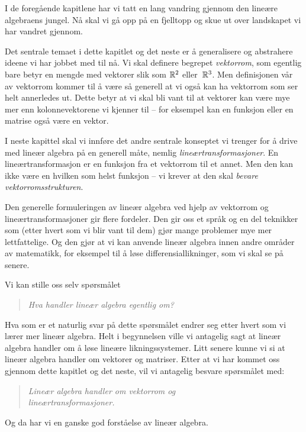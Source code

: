 

\label{ch:vektorrom}

I de foregående kapitlene har vi tatt en lang vandring gjennom den
lineære algebraens jungel.  Nå skal vi gå opp på en fjelltopp og skue
ut over landskapet vi har vandret gjennom.

Det sentrale temaet i dette kapitlet og det neste er å generalisere og
abstrahere ideene vi har jobbet med til nå.  Vi skal definere begrepet
\emph{vektorrom}, som egentlig bare betyr en mengde med vektorer slik
som $\mathbb{R}^2$ eller~$\mathbb{R}^3$.  Men definisjonen vår av vektorrom kommer til
å være så generell at vi også kan ha vektorrom som ser helt annerledes
ut.  Dette betyr at vi skal bli vant til at vektorer kan være mye mer
enn kolonnevektorene vi kjenner til -- for eksempel kan en funksjon
eller en matrise også være en vektor.

I neste kapittel skal vi innføre det andre sentrale konseptet vi
trenger for å drive med lineær algebra på en generell måte, nemlig
\emph{lineærtransformasjoner}.  En lineærtransformasjon er en funksjon
fra et vektorrom til et annet.  Men den kan ikke være en hvilken som
helst funksjon -- vi krever at den skal \emph{bevare
  vektorromsstrukturen}.

Den generelle formuleringen av lineær algebra ved hjelp av vektorrom
og lineærtransformasjoner gir flere fordeler.  Den gir oss et språk og
en del teknikker som (etter hvert som vi blir vant til dem) gjør mange
problemer mye mer lettfattelige.  Og den gjør at vi kan anvende lineær
algebra innen andre områder av matematikk, for eksempel til å løse
differensiallikninger, som vi skal se på senere.



\medskip
Vi kan stille oss selv spørsmålet
\begin{quote}
\emph{Hva handler lineær algebra egentlig om?}
\end{quote}
Hva som er et naturlig svar på dette spørsmålet endrer seg etter
hvert som vi lærer mer lineær algebra.  Helt i begynnelsen ville vi
antagelig sagt at lineær algebra handler om å løse lineære
likningssystemer.  Litt senere kunne vi si at lineær algebra handler
om vektorer og matriser.  Etter at vi har kommet oss gjennom dette
kapitlet og det neste, vil vi antagelig besvare spørsmålet med:
\begin{quote}
\emph{Lineær algebra handler om vektorrom og\\lineærtransformasjoner.}
\end{quote}
Og da har vi en ganske god forståelse av lineær algebra.


